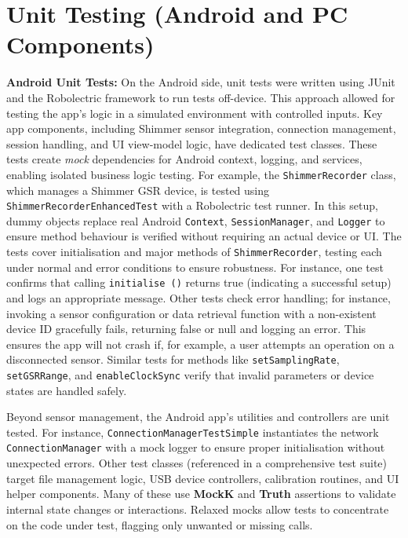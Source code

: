 \section{Unit Testing (Android and PC Components)}
\label{sec:unit-testing}
\textbf{Android Unit Tests:} On the Android side, unit tests were written using JUnit and the Robolectric framework to run tests off-device. This approach allowed for testing the app's logic in a simulated environment with controlled inputs. Key app components, including Shimmer sensor integration, connection management, session handling, and UI view-model logic, have dedicated test classes. These tests create \emph{mock} dependencies for Android context, logging, and services, enabling isolated business logic testing. For example, the \texttt{ShimmerRecorder} class, which manages a Shimmer GSR device, is tested using \texttt{ShimmerRecorderEnhancedTest} with a Robolectric test runner. In this setup, dummy objects replace real Android \texttt{Context}, \texttt{SessionManager}, and \texttt{Logger} to ensure method behaviour is verified without requiring an actual device or UI. The tests cover initialisation and major methods of \texttt{ShimmerRecorder}, testing each under normal and error conditions to ensure robustness. For instance, one test confirms that calling \texttt{initialise ()} returns true (indicating a successful setup) and logs an appropriate message. Other tests check error handling; for instance, invoking a sensor configuration or data retrieval function with a non-existent device ID gracefully fails, returning false or null and logging an error. This ensures the app will not crash if, for example, a user attempts an operation on a disconnected sensor. Similar tests for methods like \texttt{setSamplingRate}, \texttt{setGSRRange}, and \texttt{enableClockSync} verify that invalid parameters or device states are handled safely.

Beyond sensor management, the Android app's utilities and controllers are unit tested. For instance, \texttt{ConnectionManagerTestSimple} instantiates the network \texttt{ConnectionManager} with a mock logger to ensure proper initialisation without unexpected errors. Other test classes (referenced in a comprehensive test suite) target file management logic, USB device controllers, calibration routines, and UI helper components. Many of these use \textbf{MockK} and \textbf{Truth} assertions to validate internal state changes or interactions. Relaxed mocks allow tests to concentrate on the code under test, flagging only unwanted or missing calls.

